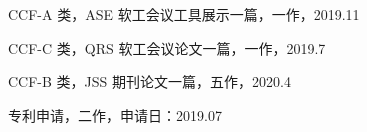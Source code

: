 \begin{resume}

  \begin{publications}
    \item CCF-A 类，ASE 软工会议工具展示一篇，一作，2019.11
    \item CCF-C 类，QRS 软工会议论文一篇，一作，2019.7
    \item CCF-B 类，JSS 期刊论文一篇，五作，2020.4
    \item 专利申请，二作，申请日：2019.07
  \end{publications}


\end{resume}


